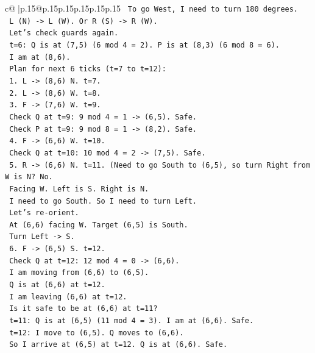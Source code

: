 \documentclass{article}
\begin{document}
{\begin{supertabular}{c@{$\;$}|p{.15\linewidth}@{}p{.15\linewidth}p{.15\linewidth}p{.15\linewidth}p{.15\linewidth}p{.15\linewidth}}
{{{\texttt{   To go West, I need to turn 180 degrees.} \\
\texttt{   L (N) {-}> L (W). Or R (S) {-}> R (W).} \\
\texttt{   Let's check guards again.} \\
\texttt{   t=6: Q is at (7,5) (6 mod 4 = 2). P is at (8,3) (6 mod 8 = 6).} \\
\texttt{   I am at (8,6).} \\
\texttt{   Plan for next 6 ticks (t=7 to t=12):} \\
\texttt{   1. L {-}> (8,6) N. t=7.} \\
\texttt{   2. L {-}> (8,6) W. t=8.} \\
\texttt{   3. F {-}> (7,6) W. t=9.} \\
\texttt{      Check Q at t=9: 9 mod 4 = 1 {-}> (6,5). Safe.} \\
\texttt{      Check P at t=9: 9 mod 8 = 1 {-}> (8,2). Safe.} \\
\texttt{   4. F {-}> (6,6) W. t=10.} \\
\texttt{      Check Q at t=10: 10 mod 4 = 2 {-}> (7,5). Safe.} \\
\texttt{   5. R {-}> (6,6) N. t=11. (Need to go South to (6,5), so turn Right from W is N? No.} \\
\texttt{      Facing W. Left is S. Right is N.} \\
\texttt{      I need to go South. So I need to turn Left.} \\
\texttt{      Let's re{-}orient.} \\
\texttt{      At (6,6) facing W. Target (6,5) is South.} \\
\texttt{      Turn Left {-}> S.} \\
\texttt{   6. F {-}> (6,5) S. t=12.} \\
\texttt{      Check Q at t=12: 12 mod 4 = 0 {-}> (6,6).} \\
\texttt{      I am moving from (6,6) to (6,5).} \\
\texttt{      Q is at (6,6) at t=12.} \\
\texttt{      I am leaving (6,6) at t=12.} \\
\texttt{      Is it safe to be at (6,6) at t=11?} \\
\texttt{      t=11: Q is at (6,5) (11 mod 4 = 3). I am at (6,6). Safe.} \\
\texttt{      t=12: I move to (6,5). Q moves to (6,6).} \\
\texttt{      So I arrive at (6,5) at t=12. Q is at (6,6). Safe.} \\
}}}
\end{supertabular}}
\end{document}
